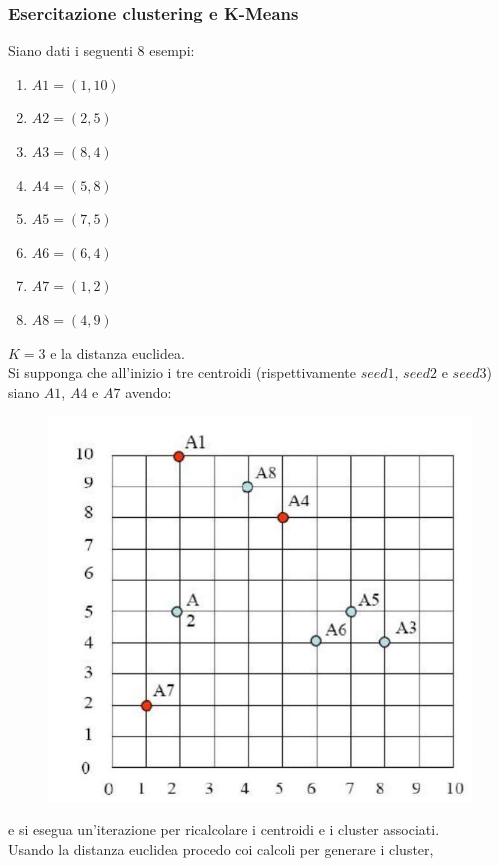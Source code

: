 \subsubsection{Esercitazione clustering e K-Means}
\begin{esercizio}
  Siano dati i seguenti 8 esempi:
  \begin{enumerate}
    \item $A1=(1, 10)$
    \item $A2=(2, 5)$
    \item $A3=(8, 4)$
    \item $A4=(5, 8)$
    \item $A5=(7, 5)$
    \item $A6=(6, 4)$
    \item $A7=(1, 2)$
    \item $A8=(4, 9)$
  \end{enumerate}
  $K=3$ e la distanza euclidea.\\
  Si supponga che all'inizio i tre centroidi (rispettivamente $seed1$, $seed2$ e
  $seed$3) siano $A1$, $A4$ e $A7$ avendo: 
  \begin{figure}[H]
    \centering
    \includegraphics[scale = 0.4]{img/clue.jpg}
  \end{figure}
  \noindent
  e si esegua un'iterazione per ricalcolare i centroidi e i cluster associati.\\
  Usando la distanza euclidea procedo coi calcoli per generare i cluster,

\end{esercizio}

